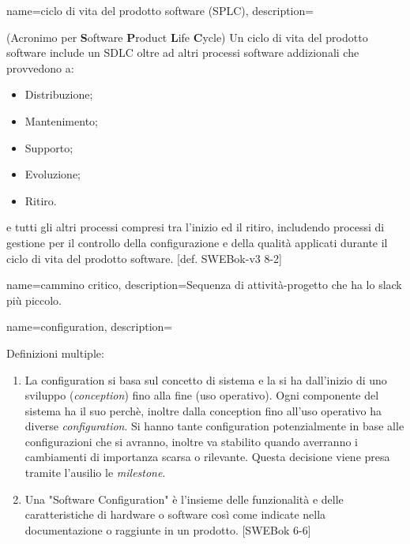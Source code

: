 {
name=ciclo di vita del prodotto software (SPLC),
description={(Acronimo per \textbf{S}oftware \textbf{P}roduct \textbf{L}ife \textbf{C}ycle) Un ciclo di vita del prodotto software include un SDLC oltre ad altri processi software addizionali che provvedono a: \begin{itemize}
\item Distribuzione;
\item Mantenimento;
\item Supporto;
\item Evoluzione;
\item Ritiro.
\end{itemize}
e tutti gli altri processi compresi tra l'inizio ed il ritiro, includendo processi di gestione per il controllo della configurazione e della qualit\`a applicati durante il ciclo di vita del prodotto software. [def. SWEBok-v3 8-2]}
}

{
name=cammino critico,
description={Sequenza di attivit\`a-progetto che ha lo slack pi\`u piccolo.}
}

{
name=configuration,
description={Definizioni multiple:
\begin{enumerate}
\item La configuration si basa sul concetto di sistema e la si ha dall'inizio di uno sviluppo (\textit{conception}) fino alla fine (uso operativo). Ogni componente del sistema ha il suo perch\`e, inoltre dalla conception fino all'uso operativo ha diverse \textit{configuration}. Si hanno tante configuration potenzialmente in base alle configurazioni che si avranno, inoltre va stabilito quando averranno i cambiamenti di importanza scarsa o rilevante. Questa decisione viene presa tramite l'ausilio le \textit{milestone}.
\item Una "Software Configuration" \`e l'insieme delle funzionalit\`a e delle caratteristiche di hardware o software cos\`i come indicate nella documentazione o raggiunte in un prodotto. [SWEBok 6-6]
\end{enumerate}
}
}


